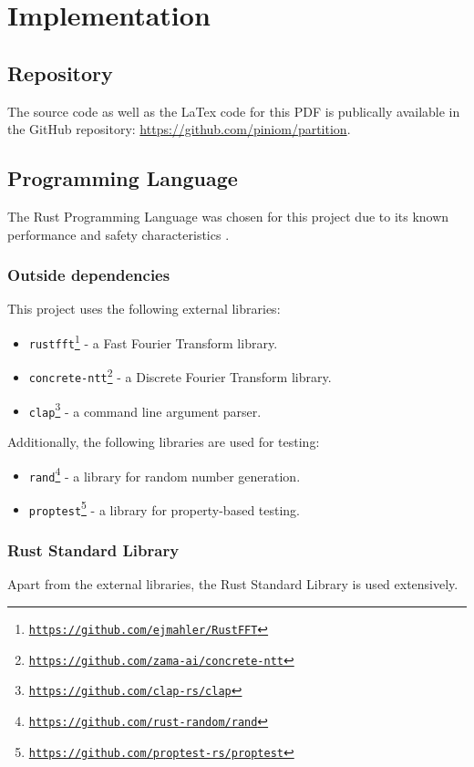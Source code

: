 \section{Implementation}

\subsection{Repository}
The source code as well as the LaTex code for this PDF is publically available in the GitHub repository: \url{https://github.com/piniom/partition}.

\subsection{Programming Language}
The Rust Programming Language was chosen for this project due to its known performance and safety characteristics \cite{rust_cpp}.

\subsubsection{Outside dependencies}
This project uses the following external libraries:
\begin{itemize}
    \item \texttt{rustfft\footnote{\url{https://github.com/ejmahler/RustFFT}}} - a Fast Fourier Transform library.
    \item \texttt{concrete-ntt\footnote{\url{https://github.com/zama-ai/concrete-ntt}}} - a Discrete Fourier Transform library.
    \item \texttt{clap\footnote{\url{https://github.com/clap-rs/clap}}} - a command line argument parser.
\end{itemize}
Additionally, the following libraries are used for testing:
\begin{itemize}
    \item \texttt{rand\footnote{\url{https://github.com/rust-random/rand}}} - a library for random number generation. 
    \item \texttt{proptest\footnote{\url{https://github.com/proptest-rs/proptest}}} - a library for property-based testing.
\end{itemize}

\subsubsection{Rust Standard Library}
Apart from the external libraries, the Rust Standard Library is used extensively.